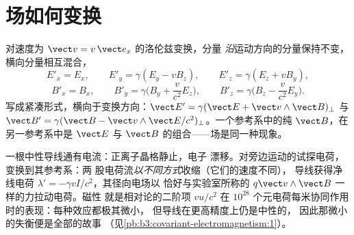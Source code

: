 \section{场如何变换}

\begin{proposition}[场的变换]\label{prop:b3:covariant-electromagnetism:transform}
对速度为 $\vect v = v\,\vect e_x$ 的洛伦兹变换，分量
\emph{沿}运动方向的分量保持不变，横向分量相互混合，
\[
E'_x = E_x , \qquad
E'_y = \gamma(E_y - vB_z) , \qquad
E'_z = \gamma(E_z + vB_y) ,
\]
\[
B'_x = B_x , \qquad
B'_y = \gamma\Big(B_y + \frac{v}{c^2}E_z\Big) , \qquad
B'_z = \gamma\Big(B_z - \frac{v}{c^2}E_y\Big) .
\]
写成紧凑形式，横向于变换方向：$\vect E' = \gamma(\vect E +
\vect v\wedge\vect B)_\perp$ 与 $\vect B' = \gamma(\vect B - \vect
v\wedge\vect E/c^2)_\perp$。一个参考系中的纯 $\vect B$，在另一参考系中是 $\vect
E$ 与 $\vect B$ 的组合——场是同一种现象。
\end{proposition}
\admitted

\begin{example}[中性导线的磁性]\label{ex:b3:covariant-electromagnetism:wire}
一根中性导线通有电流：正离子晶格静止，电子
漂移。对旁边运动的试探电荷，变换到其参考系：两
股电荷流\emph{以不同方式}收缩（它们的速度不同），
导线获得净线电荷 $\lambda' =
-\gamma vI/c^2$，其径向电场以
恰好与实验室所称的 $q\vect v\wedge\vect B$ 一样的力拉动电荷。磁性
就是相对论的二阶项 $v u/c^2$ 在
$10^{28}$ 个元电荷每米协同作用时的表现：每种效应都极其微小，
但导线在更高精度上仍是中性的，
因此那微小的失衡便是全部的故事
（见\cref{pb:b3:covariant-electromagnetism:1}）。
\end{example}

